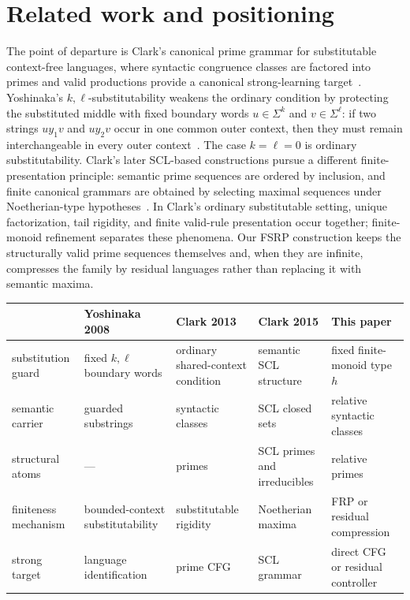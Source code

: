 \documentclass[11pt,a4paper]{article}
\begin{document}
\section{Related work and positioning}
\label{sec:related}

The point of departure is Clark's canonical prime grammar for substitutable context-free languages, where syntactic congruence classes are factored into primes and valid productions provide a canonical strong-learning target~\cite{Clark2013Trees}.  Yoshinaka's $k,\ell$-substitutability weakens the ordinary condition by protecting the substituted middle with fixed boundary words $u\in\Sigma^k$ and $v\in\Sigma^\ell$: if two strings $uy_1v$ and $uy_2v$ occur in one common outer context, then they must remain interchangeable in every outer context~\cite{Yoshinaka2008}.  The case $k=\ell=0$ is ordinary substitutability.  Clark's later SCL-based constructions pursue a different finite-presentation principle: semantic prime sequences are ordered by inclusion, and finite canonical grammars are obtained by selecting maximal sequences under Noetherian-type hypotheses~\cite{Clark2015Canonical}.  In Clark's ordinary substitutable setting, unique factorization, tail rigidity, and finite valid-rule presentation occur together; finite-monoid refinement separates these phenomena.  Our FSRP construction keeps the structurally valid prime sequences themselves and, when they are infinite, compresses the family by residual languages rather than replacing it with semantic maxima.

\begin{center}
\scriptsize
\setlength{\tabcolsep}{3pt}
\begin{tabular}{>{\raggedright\arraybackslash}p{}>{\raggedright\arraybackslash}p{}>{\raggedright\arraybackslash}p{}>{\raggedright\arraybackslash}p{}>{\raggedright\arraybackslash}p{}}
\toprule
 & Yoshinaka 2008 & Clark 2013 & Clark 2015 & This paper\\
\midrule
substitution guard & fixed $k,\ell$ boundary words & ordinary shared-context condition & semantic SCL structure & fixed finite-monoid type $h$\\
semantic carrier & guarded substrings & syntactic classes & SCL closed sets & relative syntactic classes\\
structural atoms & --- & primes & SCL primes and irreducibles & relative primes\\
finiteness mechanism & bounded-context substitutability & substitutable rigidity & Noetherian maxima & FRP or residual compression\\
strong target & language identification & prime CFG & SCL grammar & direct CFG or residual controller\\
\bottomrule
\end{tabular}
\end{center}
\end{document}
